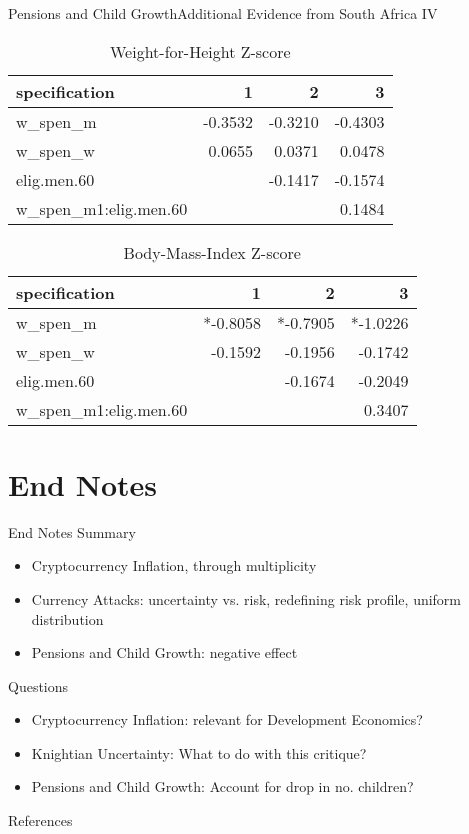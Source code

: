 \documentclass{beamer}
\begin{document}
\begin{frame}{Pensions and Child Growth}{Additional Evidence from South Africa IV}
\begin{table}[!ht]
\centering
\caption{Weight-for-Height Z-score}
\label{sa:ta:whz}
\begin{tabular}{l|rrr}
\hline
specification & 1 & 2 & 3 \\
\hline
w\_spen\_m &  -0.3532 & -0.3210 & -0.4303 \\
w\_spen\_w & 0.0655 & 0.0371 & 0.0478 \\
elig.men.60 & & -0.1417 & -0.1574 \\
w\_spen\_m1:elig.men.60 & & & 0.1484 \\
\end{tabular}
\end{table}
\begin{table}[!ht]
\centering
\caption{Body-Mass-Index Z-score}
\label{sa:ta:bmiz}
\begin{tabular}{l|rrr}
\hline
specification & 1 & 2 & 3 \\
\hline
w\_spen\_m & *-0.8058 & *-0.7905 & *-1.0226 \\
w\_spen\_w & -0.1592 & -0.1956 & -0.1742 \\
elig.men.60 & & -0.1674 & -0.2049 \\
w\_spen\_m1:elig.men.60 & & & 0.3407 \\
\end{tabular}
\end{table}
\end{frame}


\section{End Notes}

\begin{frame}{End Notes}
Summary
  \begin{itemize}
  \item
    Cryptocurrency Inflation, through multiplicity
  \item
	Currency Attacks: uncertainty vs. risk, redefining risk profile, uniform distribution 
  \item
    Pensions and Child Growth: negative effect
  \end{itemize}

Questions  
	\begin{itemize}
	\item
		Cryptocurrency Inflation: relevant for Development Economics?
	\item
		Knightian Uncertainty: What to do with this critique?
	\item
		Pensions and  Child Growth: Account for drop in no. children?
	\end{itemize}
\end{frame}

\begin{frame}[allowframebreaks]{References}
	\printbibliography
\end{frame}
\end{document}
